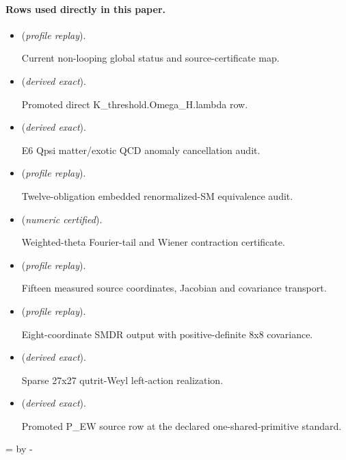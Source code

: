 \documentclass[11pt]{article}
\begin{document}
\paragraph{Rows used directly in this paper.}
\begin{itemize}
\setlength{\itemsep}{0.25em}
\item {} (\emph{profile replay}).\par Current non-looping global status and source-certificate map.
\item {} (\emph{derived exact}).\par Promoted direct K\_threshold.Omega\_H.lambda row.
\item {} (\emph{derived exact}).\par E6 Qpsi matter/exotic QCD anomaly cancellation audit.
\item {} (\emph{profile replay}).\par Twelve-obligation embedded renormalized-SM equivalence audit.
\item {} (\emph{numeric certified}).\par Weighted-theta Fourier-tail and Wiener contraction certificate.
\item {} (\emph{profile replay}).\par Fifteen measured source coordinates, Jacobian and covariance transport.
\item {} (\emph{profile replay}).\par Eight-coordinate SMDR output with positive-definite 8x8 covariance.
\item {} (\emph{derived exact}).\par Sparse 27x27 qutrit-Weyl left-action realization.
\item {} (\emph{derived exact}).\par Promoted P\_EW source row at the declared one-shared-primitive standard.
\end{itemize}

\par\begingroup{}=\pagegoal\advance{} by -\pagetotal\ifdim\dimen0<7\baselineskip\newpage\fi\endgroup
\end{document}

